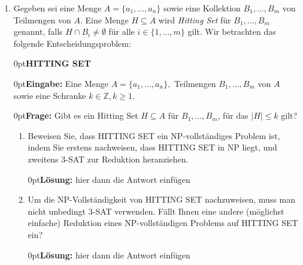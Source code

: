 \documentclass[12pt,a4paper]{scrartcl}
\newcommand{\prob}[1]{\vspace{.5\baselineskip}\begin{addmargin}[15pt]{0pt}\textbf{#1}\end{addmargin}}
\newcommand{\ein}[1]{\vspace{.5\baselineskip}\begin{addmargin}[15pt]{0pt}\textbf{Eingabe: }#1\end{addmargin}}
\newcommand{\fra}[1]{\vspace{.5\baselineskip}\begin{addmargin}[15pt]{0pt}\textbf{Frage: }#1\end{addmargin}}
\newcommand{\loesung}[1]{\vspace{.5\baselineskip}\begin{addmargin}[0pt]{0pt}\textbf{Lösung: }#1\end{addmargin}}
\begin{document}
\begin{enumerate}
\item Gegeben sei eine Menge $A = \{a_1,\ldots,a_n\}$ sowie eine Kollektion $B_1,\ldots,B_m$ von Teilmengen von $A$. Eine Menge $H \subseteq A$ wird \emph{Hitting Set} für $B_1,\ldots,B_m$ genannt, falls $H \cap B_i \neq \emptyset$ für alle $i \in \{1,\ldots,m\}$ gilt. Wir betrachten das folgende Entscheidungsproblem:

	\prob{HITTING SET}
	\ein{Eine Menge $A = \{a_1,\ldots,a_n\},$ Teilmengen $B_1,\ldots,B_m$ von $A$ sowie eine Schranke $k \in \mathds{Z}, k \geq 1$.}
	\fra{Gibt es ein Hitting Set $H \subseteq A$ für $B_1,\ldots,B_m$, für das $|H| \leq k$ gilt?}
	\begin{enumerate}
	\item Beweisen Sie, dass HITTING SET ein NP-vollständiges Problem ist, indem Sie erstens nachweisen, dass HITTING SET in NP liegt, und zweitens 3-SAT zur Reduktion heranziehen.
	
	\loesung{hier dann die Antwort einfügen}
	
	\item Um die NP-Vollständigkeit von HITTING SET nachzuweisen, muss man nicht unbedingt 3-SAT verwenden. Fällt Ihnen eine andere (möglichst einfache) Reduktion eines NP-vollständigen Problems auf HITTING SET ein?
	
	\loesung{hier dann die Antwort einfügen}
	\end{enumerate}

\end{enumerate}
\end{document}
